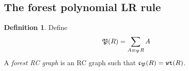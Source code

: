 \documentclass{amsart}
\newtheorem{proposition}[lemma]{Proposition}
\newtheorem{theorem}{Theorem}[section]
\theoremstyle{definition}
\newtheorem{definition}[lemma]{Definition}
\theoremstyle{remark}
\numberwithin{equation}{subsection}
\newcommand{\wof}[1]{w_{#1}}
\newcommand{\wtt}{\mathtt{wt}}
\newcommand{\QY}{\ensuremath{\mathbb{QY}}}
\newcommand{\BRC}{\mathcal{BRC}}
\newcommand{\RC}{\mathcal{RC}}
\newcommand{\code}{\mathfrak{c}}
\begin{document}


\subsection{The forest polynomial LR rule}


\begin{definition}
Define
$$\mathfrak{P}(R) = \sum_{A\equiv_{\mathfrak{P}} R} A$$
A \emph{forest RC graph} is an RC graph such that $\code_\forest(R) = \wtt(R)$. 
\end{definition}
\end{document}
